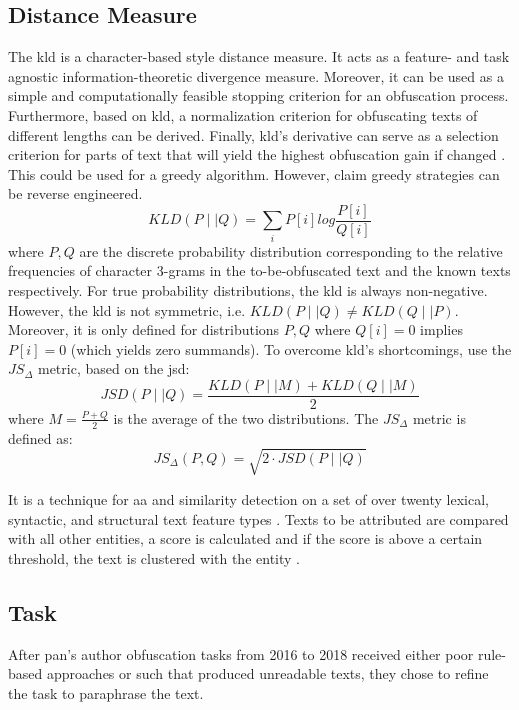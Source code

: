 \subsection{Distance Measure}
The \ac{kld} is a character-based style distance measure.
It acts as a feature- and task agnostic %
information-theoretic divergence measure.
Moreover, it can be used as a simple and computationally feasible stopping criterion for an obfuscation process.
Furthermore, based on \ac{kld}, a normalization criterion for obfuscating texts of different lengths can be derived.
Finally, \ac{kld}'s derivative can serve as a selection criterion for parts of text that 
will yield the highest obfuscation gain if changed \cite{bevendorff_divergence_based_2020}.
This could be used for a greedy algorithm.
However, \citet{bevendorff_divergence_based_2020} claim greedy strategies can be reverse engineered.
$$KLD(P\mid \mid Q) = \sum_{i}^{}P[i] log\frac{P[i]}{Q[i]}$$
where $P,Q$ are the discrete probability distribution corresponding to the relative frequencies of character 3-grams in the 
to-be-obfuscated text and the known texts respectively.
For true probability distributions, the \ac{kld} is always non-negative.
However, the \ac{kld} is not symmetric, i.e. $KLD(P\mid \mid Q) \neq KLD(Q\mid \mid P)$.
Moreover, it is only defined for distributions $P,Q$ where $Q[i] = 0$ implies $P[i] = 0$ (which yields zero summands).
To overcome \ac{kld}'s shortcomings, 
\citet{bevendorff_divergence_based_2020} use the $JS_\Delta$ metric, based on the \ac{jsd}:
$$JSD(P\mid \mid Q) = \frac{KLD(P\mid \mid M)+KLD(Q\mid \mid M)}{2}$$
where $M = \frac{P + Q}{2}$ is the average of the two distributions.
The $JS_\Delta$ metric is defined as:
$$JS_\Delta(P,Q) = \sqrt{2\cdot JSD(P\mid \mid Q)}$$

\begin{definition}
    [Writeprints]
    \label{def:writeprints}
    It is a technique for \ac{aa} and similarity detection \cite{elmanarelbouanani_authorship_2014} 
    on a set of over twenty lexical, syntactic, and structural text feature types \cite{bevendorff_divergence_based_2020}.
    Texts to be attributed are compared with all other entities, a score is calculated and if the score is above a certain threshold, 
    the text is clustered with the entity \cite{elmanarelbouanani_authorship_2014}.
\end{definition}

\subsection{Task}
After \ac{pan}'s author obfuscation tasks from 2016 to 2018 received either poor rule-based approaches or such that 
produced unreadable texts, they chose to refine the task to paraphrase the text.

